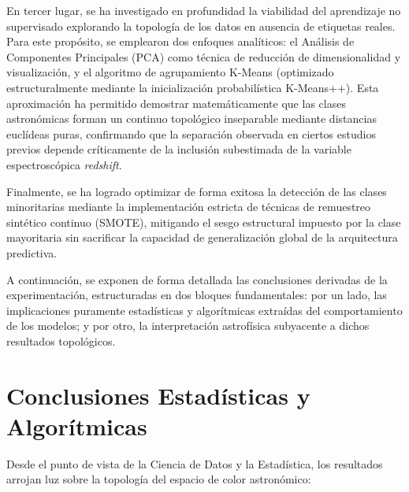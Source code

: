 \documentclass[12pt, a4paper]{report}
\begin{document}
En tercer lugar, se ha investigado en profundidad la viabilidad del aprendizaje no supervisado explorando la topología de los datos en ausencia de etiquetas reales. Para este propósito, se emplearon dos enfoques analíticos: el Análisis de Componentes Principales (PCA) como técnica de reducción de dimensionalidad y visualización, y el algoritmo de agrupamiento K-Means (optimizado estructuralmente mediante la inicialización probabilística K-Means++). Esta aproximación ha permitido demostrar matemáticamente que las clases astronómicas forman un continuo topológico inseparable mediante distancias euclídeas puras, confirmando que la separación observada en ciertos estudios previos depende críticamente de la inclusión subestimada de la variable espectroscópica \textit{redshift}.

Finalmente, se ha logrado optimizar de forma exitosa la detección de las clases minoritarias mediante la implementación estricta de técnicas de remuestreo sintético continuo (SMOTE), mitigando el sesgo estructural impuesto por la clase mayoritaria sin sacrificar la capacidad de generalización global de la arquitectura predictiva.

A continuación, se exponen de forma detallada las conclusiones derivadas de la experimentación, estructuradas en dos bloques fundamentales: por un lado, las implicaciones puramente estadísticas y algorítmicas extraídas del comportamiento de los modelos; y por otro, la interpretación astrofísica subyacente a dichos resultados topológicos.

\section{Conclusiones Estadísticas y Algorítmicas}

Desde el punto de vista de la Ciencia de Datos y la Estadística, los resultados arrojan luz sobre la topología del espacio de color astronómico:
\end{document}
